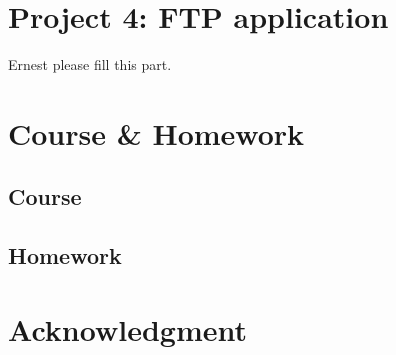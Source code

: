 \documentclass[conference,compsoc]{IEEEtran}
\begin{document}
\section{Project 4: FTP application}
	Ernest please fill this part.

\section{Course \& Homework}
	
	\subsection{Course}
	
	\subsection{Homework}

\section*{Acknowledgment}





\end{document}
